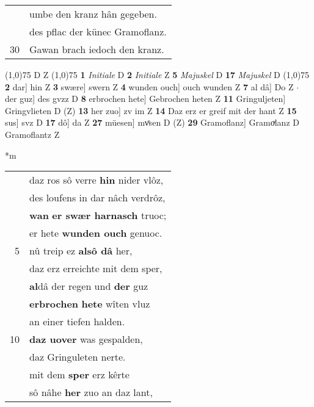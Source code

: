 \documentclass[8pt,a4paper,notitlepage]{article}
\begin{document}
\begin{table}[ht]
\begin{minipage}[t]{0.5\linewidth}
\begin{tabular}{rl}
 & umbe den kranz hân gegeben.\\ 
 & des pflac der künec Gramoflanz.\\ 
30 & Gawan brach iedoch den kranz.\\ 
\end{tabular}
\scriptsize
\line(1,0){75} \newline
D Z \newline
\line(1,0){75} \newline
\textbf{1} \textit{Initiale} D  \textbf{2} \textit{Initiale} Z  \textbf{5} \textit{Majuskel} D  \textbf{17} \textit{Majuskel} D  \newline
\line(1,0){75} \newline
\textbf{2} dar] hin Z \textbf{3} swære] swern Z \textbf{4} wunden ouch] ouch wunden Z \textbf{7} al dâ] Do Z  $\cdot$ der guz] des gvzz D \textbf{8} erbrochen hete] Gebrochen heten Z \textbf{11} Gringuljeten] Gringvlieten D (Z) \textbf{13} her zuo] zv im Z \textbf{14} Daz erz er greif mit der hant Z \textbf{15} sus] svz D \textbf{17} dô] da Z \textbf{27} müesen] mvͦsen D (Z) \textbf{29} Gramoflanz] Gramoͮlanz D Gramoflantz Z \newline
\end{minipage}
\hspace{0.5cm}
\begin{minipage}[t]{0.5\linewidth}
\small
\begin{center}*m
\end{center}
\begin{tabular}{rl}
 & daz ros sô verre \textbf{hin} nider vlôz,\\ 
 & des loufens in dar nâch verdrôz,\\ 
 & \textbf{wan} \textbf{er swær harnasch} truoc;\\ 
 & er hete \textbf{wunden ouch} genuoc.\\ 
5 & nû treip ez \textbf{alsô dâ} her,\\ 
 & daz erz erreichte mit dem sper,\\ 
 & \textbf{al}dâ der regen und \textbf{der} guz\\ 
 & \textbf{erbrochen} \textbf{hete} wîten vluz\\ 
 & an einer tiefen halden.\\ 
10 & \textbf{daz uover} was gespalden,\\ 
 & daz Gringuleten nerte.\\ 
 & mit dem \textbf{sper} erz kêrte\\ 
 & sô nâhe \textbf{her} zuo an daz lant,\\ 

\end{tabular}
\end{minipage}
\end{table}
\end{document}
